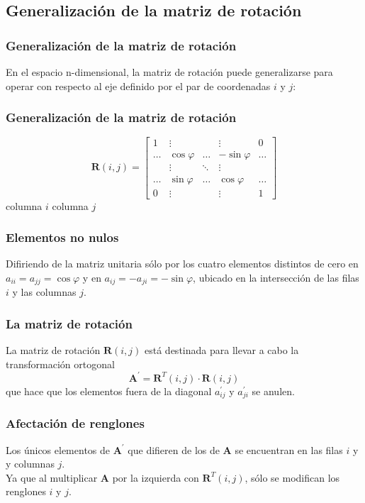 \subsection*{Generalización de la matriz de rotación}
\begin{frame}
\frametitle{Generalización de la matriz de rotación}
En el espacio n-dimensional, la matriz de rotación puede generalizarse para operar con respecto al eje definido por el par de coordenadas $i$ y $j$:
\end{frame}
\begin{frame}
\frametitle{Generalización de la matriz de rotación}
\begin{equation}
\mathbf{R}(i,j) = \begin{bmatrix}
1 & \vdots & & \vdots & 0 \\
\ldots & \cos \varphi & \ldots & - \sin \varphi & \ldots \\
 & \vdots & \ddots & \vdots &  \\
\ldots & \sin \varphi & \ldots & \cos \varphi & \ldots \\
0 & \vdots & & \vdots & 1
\end{bmatrix}
\end{equation}
\fontsize{12}{12}\selectfont
\hspace{4cm} columna $i$ \hspace{0.3cm} columna $j$
\end{frame}
\begin{frame}
\frametitle{Elementos no nulos}
Difiriendo de la matriz unitaria sólo por los cuatro elementos distintos de cero en $a_{ii} = a_{jj} = \cos \varphi$ y en  $a_{ij} = -a_{ji} = - \sin \varphi$, ubicado en la intersección de las filas $i$ y las columnas $j$.
\end{frame}
\begin{frame}
\frametitle{La matriz de rotación}
La matriz de rotación $\mathbf{R}(i, j)$ está destinada para llevar a cabo la transformación ortogonal
\begin{equation}
\mathbf{A}^{\prime} =  \mathbf{R}^{T}(i, j) \cdot \mathbf{R}(i, j)
\label{eq:ecuacion_08_16}    	
\end{equation}
que hace que los elementos fuera de la diagonal $a^{\prime}_{ij}$ y $a^{\prime}_{ji}$ se anulen.
\end{frame}
\begin{frame}
\frametitle{Afectación de renglones}
Los únicos elementos de $\mathbf{A}^{\prime}$ que difieren de los de $\mathbf{A}$ se encuentran en las filas $i$ y y columnas $j$.
\\
\bigskip
Ya que al multiplicar $\mathbf{A}$ por la izquierda con $\mathbf{R}^{T}(i, j)$, sólo se modifican los renglones $i$ y $j$.
\end{frame}
